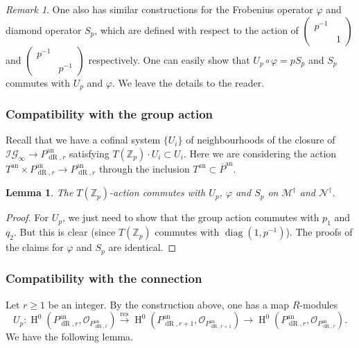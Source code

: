 \documentclass[10pt, oneside]{amsart}
\numberwithin{equation}{subsection}
\newtheorem{lemma}[equation]{Lemma}
\theoremstyle{definition}
\theoremstyle{remark}
\newtheorem{remark}[equation]{Remark}
\newcommand{\mbb}[1]{\mathbb{#1}}
\newcommand{\opn}[1]{\operatorname{#1}}
\begin{document}
\begin{remark}
    One also has similar constructions for the Frobenius operator $\varphi$ and diamond operator $S_p$, which are defined with respect to the action of $\left( \begin{smallmatrix} p^{-1} & \\ & 1 \end{smallmatrix} \right)$ and $\left( \begin{smallmatrix} p^{-1} & \\ & p^{-1} \end{smallmatrix} \right)$ respectively. One can easily show that $U_p \circ \varphi = p S_p$ and $S_p$ commutes with $U_p$ and $\varphi$. We leave the details to the reader.
\end{remark}

\subsubsection{Compatibility with the group action}

Recall that we have a cofinal system $\{U_i \}$ of neighbourhoods of the closure of $\mathcal{IG}_{\infty} \to P_{\opn{dR}, r}^{\opn{an}}$ satisfying $T(\mbb{Z}_p) \cdot U_i \subset U_i$. Here we are considering the action $T^{\opn{an}} \times P_{\opn{dR}, r}^{\opn{an}} \to P_{\opn{dR}, r}^{\opn{an}}$ through the inclusion $T^{\opn{an}} \subset \overline{P}^{\opn{an}}$.

\begin{lemma}
The $T(\mbb{Z}_p)$-action commutes with $U_p$, $\varphi$ and $S_p$ on $\mathscr{M}^{\dagger}$ and $\mathscr{N}^{\dagger}$.
\end{lemma}
\begin{proof}
For $U_p$, we just need to show that the group action commutes with $p_1$ and $q_2$. But this is clear (since $T(\mbb{Z}_p)$ commutes with $\opn{diag}(1, p^{-1})$). The proofs of the claims for $\varphi$ and $S_p$ are identical.
\end{proof}

\subsubsection{Compatibility with the connection}

Let $r \geq 1$ be an integer. By the construction above, one has a map $R$-modules
\[
U_p \colon \opn{H}^0\left( P_{\opn{dR}, r}^{\opn{an}}, \mathcal{O}_{P_{\opn{dR}, r}^{\opn{an}}} \right) \xrightarrow{\opn{res}} \opn{H}^0\left( P_{\opn{dR}, r+1}^{\opn{an}}, \mathcal{O}_{P_{\opn{dR}, r+1}^{\opn{an}}} \right) \to \opn{H}^0\left( P_{\opn{dR}, r}^{\opn{an}}, \mathcal{O}_{P_{\opn{dR}, r}^{\opn{an}}} \right) .
\]
We have the following lemma.
\end{document}
